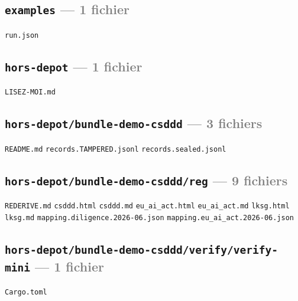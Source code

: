 \documentclass[10pt]{report}
\newcommand{\code}[1]{\texttt{\small #1}}
\begin{document}
\subsection*{\code{examples} \normalfont\textcolor{grey}{--- 1 fichier}}
\begin{sloppypar}\footnotesize\raggedright
\code{run.json}
\end{sloppypar}

\subsection*{\code{hors-depot} \normalfont\textcolor{grey}{--- 1 fichier}}
\begin{sloppypar}\footnotesize\raggedright
\code{LISEZ-MOI.md}
\end{sloppypar}

\subsection*{\code{hors-depot/bundle-demo-csddd} \normalfont\textcolor{grey}{--- 3 fichiers}}
\begin{sloppypar}\footnotesize\raggedright
\code{README.md} \;\textbullet\; \code{records.TAMPERED.jsonl} \;\textbullet\; \code{records.sealed.jsonl}
\end{sloppypar}

\subsection*{\code{hors-depot/bundle-demo-csddd/reg} \normalfont\textcolor{grey}{--- 9 fichiers}}
\begin{sloppypar}\footnotesize\raggedright
\code{REDERIVE.md} \;\textbullet\; \code{csddd.html} \;\textbullet\; \code{csddd.md} \;\textbullet\; \code{eu\_ai\_act.html} \;\textbullet\; \code{eu\_ai\_act.md} \;\textbullet\; \code{lksg.html} \;\textbullet\; \code{lksg.md} \;\textbullet\; \code{mapping.diligence.2026-06.json} \;\textbullet\; \code{mapping.eu\_ai\_act.2026-06.json}
\end{sloppypar}

\subsection*{\code{hors-depot/bundle-demo-csddd/verify/verify-mini} \normalfont\textcolor{grey}{--- 1 fichier}}
\begin{sloppypar}\footnotesize\raggedright
\code{Cargo.toml}
\end{sloppypar}
\end{document}
